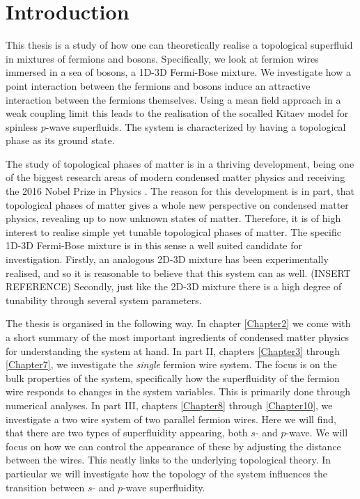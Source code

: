 
\chapter{Introduction} %

\label{Chapter1} %



This thesis is a study of how one can theoretically realise a topological superfluid in mixtures of fermions and bosons. Specifically, we look at fermion wires immersed in a sea of bosons, a 1D-3D Fermi-Bose mixture. We investigate how a point interaction between the fermions and bosons induce an attractive interaction between the fermions themselves. Using a mean field approach in a weak coupling limit this leads to the realisation of the socalled Kitaev model for spinless $p$-wave superfluids. The system is characterized by having a topological phase as its ground state. 

The study of topological phases of matter is in a thriving development, being one of the biggest research areas of modern condensed matter physics and receiving the 2016 Nobel Prize in Physics \cite{NobelPrize2016}. The reason for this development is in part, that topological phases of matter gives a whole new perspective on condensed matter physics, revealing up to now unknown states of matter. Therefore, it is of high interest to realise simple yet tunable topological phases of matter. The specific 1D-3D Fermi-Bose mixture is in this sense a well suited candidate for investigation. Firstly, an analogous 2D-3D mixture has been experimentally realised, and so it is reasonable to believe that this system can as well. (INSERT REFERENCE) Secondly, just like the 2D-3D mixture there is a high degree of tunability through several system parameters. 

The thesis is organised in the following way. In chapter \ref{Chapter2} we come with a short summary of the most important ingredients of condensed matter physics for understanding the system at hand. In part II, chapters \ref{Chapter3} through \ref{Chapter7}, we investigate the \textit{single} fermion wire system. The focus is on the bulk properties of the system, specifically how the superfluidity of the fermion wire responds to changes in the system variables. This is primarily done through numerical analyses. In part III, chapters \ref{Chapter8} through \ref{Chapter10}, we investigate a two wire system of two parallel fermion wires. Here we will find, that there are two types of superfluidity appearing, both $s$- and $p$-wave. We will focus on how we can control the appearance of these by adjusting the distance between the wires. This neatly links to the underlying topological theory. In particular we will investigate how the topology of the system influences the transition between $s$- and $p$-wave superfluidity.   